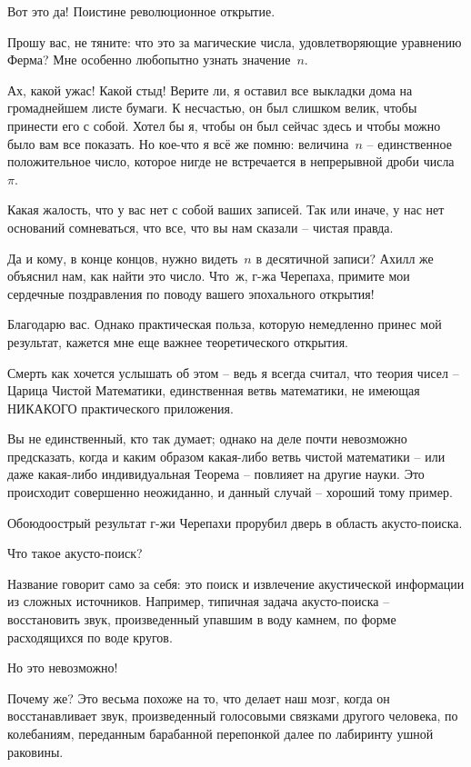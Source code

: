 \documentclass[../main.tex]{subfiles}
\begin{document}
\begin{dialogue}
 Вот это да! Поистине революционное открытие.

 Прошу вас, не тяните: что это за магические числа, удовлетворяющие уравнению Ферма? Мне особенно любопытно узнать значение~$n$.

 Ах, какой ужас! Какой стыд! Верите ли, я оставил все выкладки дома на громаднейшем листе бумаги. К несчастью, он был слишком велик, чтобы принести его с собой. Хотел бы я, чтобы он был сейчас здесь и чтобы можно было вам все показать. Но кое-что я всё же помню: величина~$n$ \--- единственное положительное число, которое нигде не встречается в непрерывной дроби числа~$\pi$.

 Какая жалость, что у вас нет с собой ваших записей. Так или иначе, у нас нет оснований сомневаться, что все, что вы нам сказали \--- чистая правда.

 Да и кому, в конце концов, нужно видеть~$n$ в десятичной записи? Ахилл же объяснил нам, как найти это число. Что~ж, г-жа Черепаха, примите мои сердечные поздравления по поводу вашего эпохального открытия!

 Благодарю вас. Однако практическая польза, которую немедленно принес мой результат, кажется мне еще важнее теоретического открытия.

 Смерть как хочется услышать об этом \--- ведь я всегда считал, что теория чисел \--- Царица Чистой Математики, единственная ветвь математики, не имеющая НИКАКОГО практического приложения.

 Вы не единственный, кто так думает; однако на деле почти невозможно предсказать, когда и каким образом какая-либо ветвь чистой математики \--- или даже какая-либо индивидуальная Теорема \--- повлияет на другие науки. Это происходит совершенно неожиданно, и данный случай \--- хороший тому пример.

 Обоюдоострый результат г-жи Черепахи прорубил дверь в область акусто-поиска.

 Что такое акусто-поиск?

 Название говорит само за себя: это поиск и извлечение акустической информации из сложных источников. Например, типичная задача акусто-поиска \--- восстановить звук, произведенный упавшим в воду камнем, по форме расходящихся по воде кругов.

 Но это невозможно!

 Почему же? Это весьма похоже на то, что делает наш мозг, когда он восстанавливает звук, произведенный голосовыми связками другого человека, по колебаниям, переданным барабанной перепонкой далее по лабиринту ушной раковины.


\end{dialogue}
\end{document}
